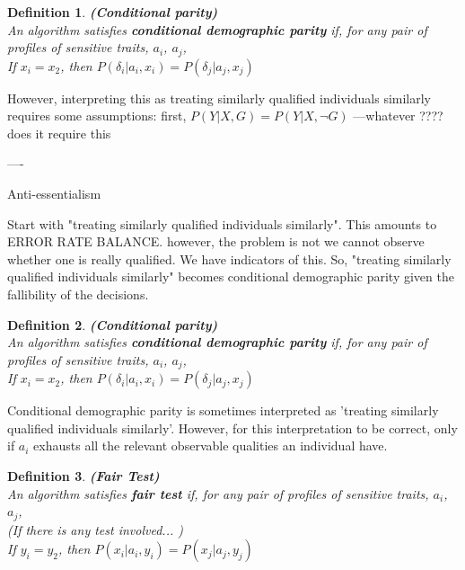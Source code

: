 \documentclass{article}
\newtheorem{definition}{Definition}
\begin{document}
\begin{definition}
\textup{\textbf{ (Conditional parity) } \\
\indent
An algorithm satisfies \textbf{conditional demographic parity} if, for any pair of profiles of sensitive traits}, $a_i$,  $a_j$, \\

\textup{If } $x_i = x_2$\textup{, then } $P(\delta_i|a_i, x_i) = P(\delta_j|a_j, x_j)$
\end{definition}

However, interpreting this as treating similarly qualified individuals similarly requires some assumptions: first, $P(Y|X, G) = P(Y|X, \neg G)$ ---whatever ????  does it require this

----

Anti-essentialism



Start with "treating similarly qualified individuals similarly". This amounts to ERROR RATE BALANCE. however, the problem is not we cannot observe whether one is really qualified. We have indicators of this. So, "treating similarly qualified individuals similarly" becomes conditional demographic parity given the fallibility of the decisions. 


\begin{definition}
\textup{\textbf{ (Conditional parity) } \\
\indent
An algorithm satisfies \textbf{conditional demographic parity} if, for any pair of profiles of sensitive traits}, $a_i$,  $a_j$, \\

\textup{If } $x_i = x_2$\textup{, then } $P(\delta_i|a_i, x_i) = P(\delta_j|a_j, x_j)$
\end{definition}

Conditional demographic parity is sometimes interpreted as 'treating similarly qualified individuals similarly'. However, for this interpretation to be correct, only if $a_i$ exhausts all the relevant observable qualities an individual have. 


\begin{definition}
\textup{\textbf{ (Fair Test) } \\
\indent
An algorithm satisfies \textbf{fair test} if, for any pair of profiles of sensitive traits}, $a_i$,  $a_j$, \\
(If there is any test involved... )
\\

\textup{If } $y_i = y_2$\textup{, then } $P(x_i|a_i, y_i) = P(x_j|a_j, y_j)$
\end{definition}
\end{document}
